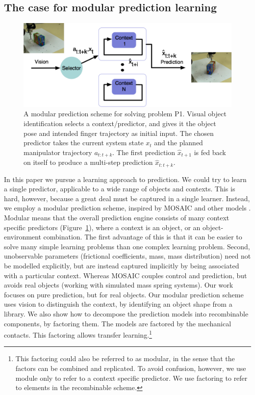 \subsection{The case for modular prediction learning}
\begin{figure}[t]
\centerline{\includegraphics[width=0.99\columnwidth]{modular-schema-new}}
\caption{A modular prediction scheme for solving problem P1. Visual object identification selects a context/predictor, and gives it the object pose and intended finger trajectory as initial input. The chosen predictor takes the current system state $x_t$ and the planned manipulator trajectory $a_{t:t+k}$. The first prediction $\hat{x}_{t+1}$ is fed back on itself to produce a multi-step prediction $\hat{x}_{t:t+k}$. \label{fig:modular-simple}}
\end{figure}
In this paper we pursue a learning approach to prediction. We could try to learn a single predictor, applicable to a wide range of objects and contexts. This is hard, however, because a great deal must be captured in a single learner. Instead, we employ a modular prediction scheme, inspired by MOSAIC \citep{Haruno_MOSAIC_2008} and other models \citep{demiris2003distributed}. Modular means that the overall prediction engine consists of many context specific predictors (Figure~\ref{fig:modular-simple}), where a context is an object, or an object-environment combination. The first advantage of this is that it can be easier to solve many simple learning problems than one complex learning problem. Second, unobservable parameters (frictional coefficients, mass, mass distribution) need not be modelled explicitly, but are instead captured implicitly by being associated with a particular context. Whereas MOSAIC couples control and prediction, but avoids real objects (working with simulated mass spring systems). Our work focuses on pure prediction, but for real objects. Our modular prediction scheme uses vision to distinguish the context, by identifying an object shape from a library. We also show how to decompose the prediction models into recombinable components, by factoring them. The models are factored by the mechanical contacts. This factoring allows transfer learning.\footnote{This factoring could also be referred to as modular, in the sense that the factors can be combined and replicated. To avoid confusion, however, we use module only to refer to a context specific predictor. We use factoring to refer to elements in the recombinable scheme.}
